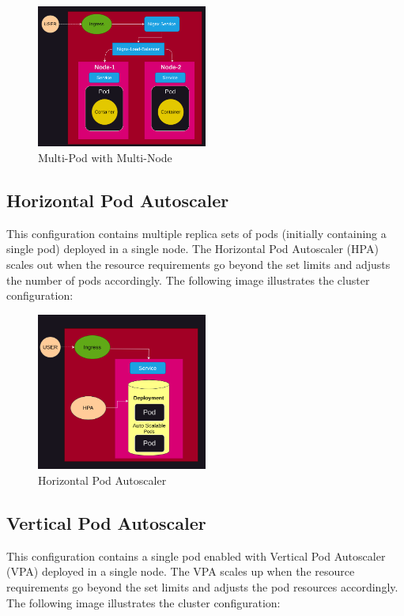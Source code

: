 \documentclass{article}
\begin{document}
\begin{figure}[h]
   \centering
   \includegraphics[width=0.5\textwidth]{../images/two_node.png}
   \caption{Multi-Pod with Multi-Node}
\end{figure}

\subsection{Horizontal Pod Autoscaler}
This configuration contains multiple replica sets of pods (initially containing a single pod) deployed in a single node. The Horizontal Pod Autoscaler (HPA) scales out when the resource requirements go beyond the set limits and adjusts the number of pods accordingly. The following image illustrates the cluster configuration:

\begin{figure}[h]
   \centering
   \includegraphics[width=0.5\textwidth]{../images/hpa.png}
   \caption{Horizontal Pod Autoscaler}
\end{figure}

\subsection{Vertical Pod Autoscaler}
This configuration contains a single pod enabled with Vertical Pod Autoscaler (VPA) deployed in a single node. The VPA scales up when the resource requirements go beyond the set limits and adjusts the pod resources accordingly. The following image illustrates the cluster configuration:
\end{document}
